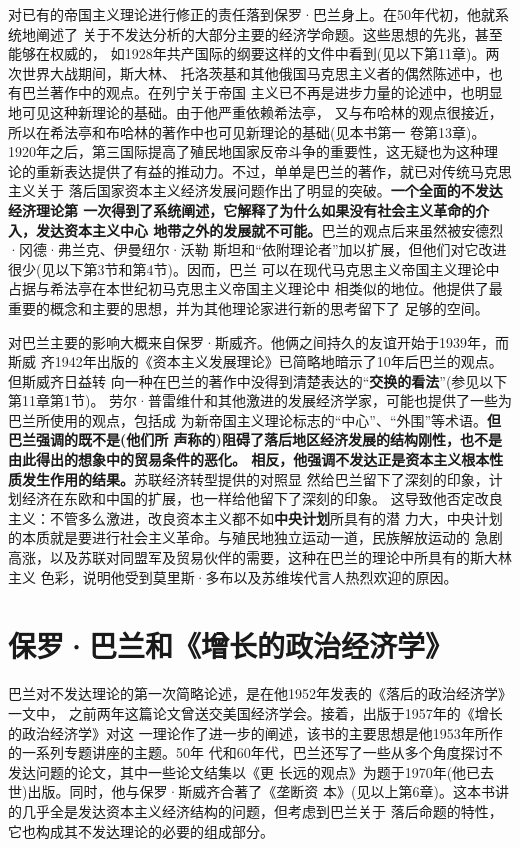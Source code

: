 对已有的帝国主义理论进行修正的责任落到保罗·巴兰身上。在50年代初，他就系统地阐述了
关于不发达分析的大部分主要的经济学命题。这些思想的先兆，甚至能够在权威的，
如1928年共产国际的纲要这样的文件中看到(见以下第11章)。两次世界大战期间，斯大林、
托洛茨基和其他俄国马克思主义者的偶然陈述中，也有巴兰著作中的观点。在列宁关于帝国
主义已不再是进步力量的论述中，也明显地可见这种新理论的基础。由于他严重依赖希法亭，
又与布哈林的观点很接近，所以在希法亭和布哈林的著作中也可见新理论的基础(见本书第一
卷第13章)。1920年之后，第三国际提高了殖民地国家反帝斗争的重要性，这无疑也为这种理
论的重新表达提供了有益的推动力。不过，单单是巴兰的著作，就已对传统马克思主义关于
落后国家资本主义经济发展问题作出了明显的突破。\textbf{一个全面的不发达经济理论第
  一次得到了系统阐述，它解释了为什么如果没有社会主义革命的介入，发达资本主义中心
  地带之外的发展就不可能。}巴兰的观点后来虽然被安德烈·冈德·弗兰克、伊曼纽尔·沃勒
斯坦和“依附理论者”加以扩展，但他们对它改进很少(见以下第3节和第4节)。因而，巴兰
可以在现代马克思主义帝国主义理论中占据与希法亭在本世纪初马克思主义帝国主义理论中
相类似的地位。他提供了最重要的概念和主要的思想，并为其他理论家进行新的思考留下了
足够的空间。

对巴兰主要的影响大概来自保罗·斯威齐。他俩之间持久的友谊开始于1939年，而斯威
齐1942年出版的《资本主义发展理论》已简略地暗示了10年后巴兰的观点。但斯威齐日益转
向一种在巴兰的著作中没得到清楚表达的“\textbf{交换的看法}”(参见以下第11章第1节)。
劳尔·普雷维什和其他激进的发展经济学家，可能也提供了一些为巴兰所使用的观点，包括成
为新帝国主义理论标志的“中心”、“外围”等术语。\textbf{但巴兰强调的既不是(他们所
  声称的)阻碍了落后地区经济发展的结构刚性，也不是由此得出的想象中的贸易条件的恶化。
  相反，他强调不发达正是资本主义根本性质发生作用的结果。}苏联经济转型提供的对照显
然给巴兰留下了深刻的印象，计划经济在东欧和中国的扩展，也一样给他留下了深刻的印象。
这导致他否定改良主义：不管多么激进，改良资本主义都不如\textbf{中央计划}所具有的潜
力大，中央计划的本质就是要进行社会主义革命。与殖民地独立运动一道，民族解放运动的
急剧高涨，以及苏联对同盟军及贸易伙伴的需要，这种在巴兰的理论中所具有的斯大林主义
色彩，说明他受到莫里斯·多布以及苏维埃代言人热烈欢迎的原因。

\section{保罗·巴兰和《增长的政治经济学》}

巴兰对不发达理论的第一次简略论述，是在他1952年发表的《落后的政治经济学》一文中，
之前两年这篇论文曾送交美国经济学会。接着，出版于1957年的《增长的政治经济学》对这
一理论作了进一步的阐述，该书的主要思想是他1953年所作的一系列专题讲座的主题。50年
代和60年代，巴兰还写了一些从多个角度探讨不发达问题的论文，其中一些论文结集以《更
长远的观点》为题于1970年(他已去世)出版。同时，他与保罗·斯威齐合著了《垄断资
本》(见以上第6章)。这本书讲的几乎全是发达资本主义经济结构的问题，但考虑到巴兰关于
落后命题的特性，它也构成其不发达理论的必要的组成部分。

